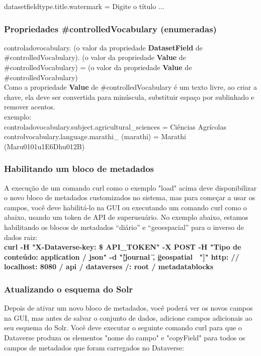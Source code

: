 \documentclass[12pt,hidelinks]{article}
\begin{document}
datasetfieldtype.title.watermark = Digite o título ...

\subsubsection{Propriedades \#controlledVocabulary (enumeradas)}

\qquad controladovocabulary. (o valor da propriedade \textbf{DatasetField} de \#controlledVocabulary). (o valor da propriedade \textbf{Value} de \#controlledVocabulary) = (o valor da propriedade \textbf{Value} de \#controlledVocabulary)\\

Como a propriedade \textbf{Value} de \#controlledVocabulary é um texto livre, ao criar a chave, ela deve ser convertida para minúscula, substituir espaço por sublinhado e remover acentos.\\

exemplo:\\

controladovocabulary.subject.agricultural\_sciences = Ciências Agrícolas\\

controlvocabulary.language.marathi\_ (marathi) = Marathi (Maru0101u1E6Dhu012B)\\

\subsubsection{Habilitando um bloco de metadados}

\qquad A execução de um comando curl como o exemplo "load" acima deve disponibilizar o novo bloco de metadados customizados no sistema, mas para começar a usar os campos, você deve habilitá-lo na GUI ou executando um comando curl como o abaixo, usando um token de API de superusuário. No exemplo abaixo, estamos habilitando os blocos de metadados “diário” e “geoespacial” para o inverso de dados raiz:\\

\textbf{curl -H "X-Dataverse-key: \$ API\_TOKEN" -X POST -H "Tipo de conteúdo: application / json" -d "[\" journal \", \" geospatial \ "]" http: // localhost: 8080 / api / dataverses /: root / metadatablocks}

\subsubsection{Atualizando o esquema do Solr}

\qquad Depois de ativar um novo bloco de metadados, você poderá ver os novos campos na GUI, mas antes de salvar o conjunto de dados, adicione campos adicionais ao seu esquema do Solr. Você deve executar o seguinte comando curl para que o Dataverse produza os elementos "nome do campo" e "copyField" para todos os campos de metadados que foram carregados no Dataverse:\\
\end{document}
